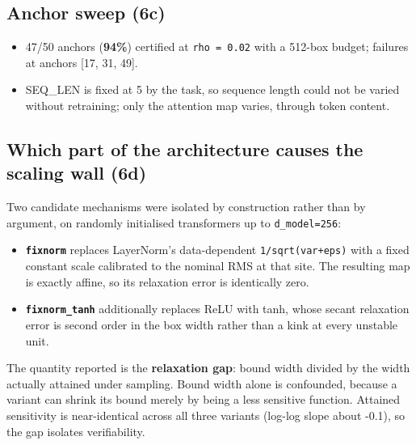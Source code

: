 \documentclass[sn-nature,pdflatex]{sn-jnl}
\begin{document}
\subsection{Anchor sweep (6c)}
\begin{itemize}
\item 47/50 anchors (\textbf{94\%}) certified at \texttt{rho = 0.02} with a 512-box budget; failures at anchors [17, 31, 49].
\item SEQ\_LEN is fixed at 5 by the task, so sequence length could not be varied without retraining; only the attention map varies, through token content.
\end{itemize}
\subsection{Which part of the architecture causes the scaling wall (6d)}
Two candidate mechanisms were isolated by construction rather than by argument, on randomly initialised transformers up to \texttt{d\_model=256}:
\begin{itemize}
\item \textbf{\texttt{fixnorm}} replaces LayerNorm's data-dependent \texttt{1/sqrt(var+eps)} with a fixed constant scale calibrated to the nominal RMS at that site. The resulting map is exactly affine, so its relaxation error is identically zero.
\item \textbf{\texttt{fixnorm\_tanh}} additionally replaces ReLU with tanh, whose secant relaxation error is second order in the box width rather than a kink at every unstable unit.
\end{itemize}
The quantity reported is the \textbf{relaxation gap}: bound width divided by the width actually attained under sampling. Bound width alone is confounded, because a variant can shrink its bound merely by being a less sensitive function. Attained sensitivity is near-identical across all three variants (log-log slope about -0.1), so the gap isolates verifiability.
\end{document}
